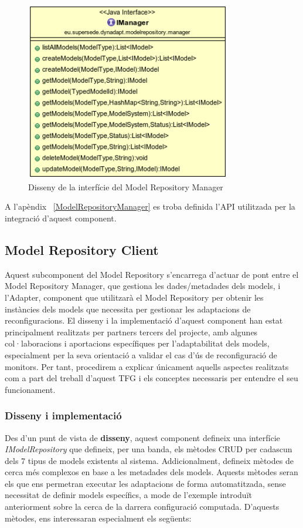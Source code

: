\begin{figure}
\centering
\includegraphics[width=9cm]{Figures/Figure27}
\decoRule
\caption{Disseny de la interfície del Model Repository Manager}
\label{fig:Figura27}
\end{figure}

A l'apèndix ~\ref{ModelRepositoryManager} es troba definida l'API utilitzada per la integració d'aquest component.

\subsection{Model Repository Client}

Aquest subcomponent del Model Repository s'encarrega d'actuar de pont entre el Model Repository Manager, que gestiona les dades/metadades dels models, i l'Adapter, component que utilitzarà el Model Repository per obtenir les instàncies dels models que necessita per gestionar les adaptacions de reconfiguracions. El disseny i la implementació d'aquest component han estat principalment realitzats per partners tercers del projecte, amb algunes col·laboracions i aportacions específiques per l'adaptabilitat dels models, especialment per la seva orientació a validar el cas d'ús de reconfiguració de monitors. Per tant, procedirem a explicar únicament aquells aspectes realitzats com a part del treball d'aquest TFG i els conceptes necessaris per entendre el seu funcionament.\\

\subsubsection{Disseny i implementació}

Des d'un punt de vista de \textbf{disseny}, aquest component defineix una interfície \textit{IModelRepository} que defineix, per una banda, els mètodes CRUD per cadascun dels 7 tipus de models existents al sistema. Addicionalment, defineix mètodes de cerca més complexos en base a les metadades dels models. Aquests mètodes seran els que ens permetran executar les adaptacions de forma automatitzada, sense necessitat de definir models específics, a mode de l'exemple introduït anteriorment sobre la cerca de la darrera configuració computada. D'aquests mètodes, ens interessaran especialment els següents:

